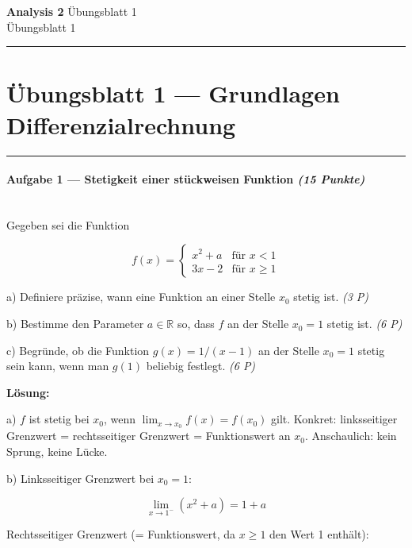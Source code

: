 \documentclass[11pt, a4paper]{article}
\providecommand{\nichttitle}{Übungsblatt}
\providecommand{\nichtsubtitle}{}
\renewcommand{\nichttitle}{Analysis 2}
\renewcommand{\nichtsubtitle}{Übungsblatt 1}
\begin{document}
\begin{center}
{\Large\bfseries\color{accent}\nichttitle}
\ifx\nichtsubtitle\empty\else
  \\[2pt]{\normalsize\color{accent!80!black}\nichtsubtitle}
\fi
\\[2pt]
\color{accent}\rule{0.4\linewidth}{0.8pt}\color{black}
\end{center}
\vspace{4pt}


\section{Übungsblatt 1 — Grundlagen Differenzialrechnung}


\noindent\textcolor{rulegray}{\rule{\linewidth}{0.4pt}}


\paragraph{Aufgabe 1 — Stetigkeit einer stückweisen Funktion \textit{(15 Punkte)}}\mbox{}\\[2pt]

Gegeben sei die Funktion


\[
f(x) = \begin{cases} x^2 + a & \text{für } x < 1 \\ 3x - 2 & \text{für } x \geq 1 \end{cases}
\]


a) Definiere präzise, wann eine Funktion an einer Stelle $x_0$ stetig ist. \textit{(3 P)}

b) Bestimme den Parameter $a \in \mathbb{R}$ so, dass $f$ an der Stelle $x_0 = 1$ stetig ist. \textit{(6 P)}

c) Begründe, ob die Funktion $g(x) = 1/(x-1)$ an der Stelle $x_0 = 1$ stetig sein kann, wenn man $g(1)$ beliebig festlegt. \textit{(6 P)}


\textbf{Lösung:}


a) $f$ ist stetig bei $x_0$, wenn $\lim_{x \to x_0} f(x) = f(x_0)$ gilt. Konkret: linksseitiger Grenzwert = rechtsseitiger Grenzwert = Funktionswert an $x_0$. Anschaulich: kein Sprung, keine Lücke.


b) Linksseitiger Grenzwert bei $x_0 = 1$:

\[
\lim_{x \to 1^-} (x^2 + a) = 1 + a
\]

Rechtsseitiger Grenzwert (= Funktionswert, da $x \geq 1$ den Wert 1 enthält):
\end{document}
